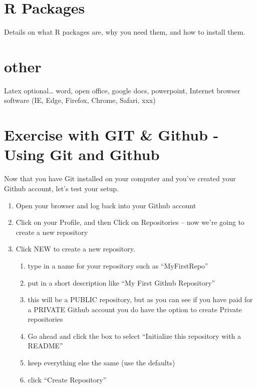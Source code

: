 \documentclass[
]{book}
\providecommand{\tightlist}{%
  \setlength{\itemsep}{0pt}\setlength{\parskip}{0pt}}
\begin{document}
\hypertarget{r-packages}{%
\section{R Packages}\label{r-packages}}

Details on what R packages are, why you need them, and how to install them.

\hypertarget{other}{%
\section{other}\label{other}}

Latex optional\ldots{} word, open office, google docs, powerpoint, Internet browser software (IE, Edge, Firefox, Chrome, Safari, xxx)

\hypertarget{exercise-with-git-github---using-git-and-github}{%
\section{Exercise with GIT \& Github - Using Git and Github}\label{exercise-with-git-github---using-git-and-github}}

Now that you have Git installed on your computer and you've created your Github account, let's test your setup.

\begin{enumerate}
\def\labelenumi{\arabic{enumi}.}
\tightlist
\item
  Open your browser and log back into your Github account
\item
  Click on your Profile, and then Click on Repositories -- now we're going to create a new repository
\item
  Click NEW to create a new repository.

  \begin{enumerate}
  \def\labelenumii{\alph{enumii}.}
  \tightlist
  \item
    type in a name for your repository such as ``MyFirstRepo''
  \item
    put in a short description like ``My First Github Repository''
  \item
    this will be a PUBLIC repository, but as you can see if you have paid for a PRIVATE Github account you do have the option to create Private repositories
  \item
    Go ahead and click the box to select ``Initialize this repository with a README''
  \item
    keep everything else the same (use the defaults)
  \item
    click ``Create Repository''
  \end{enumerate}
\end{enumerate}
\end{document}
